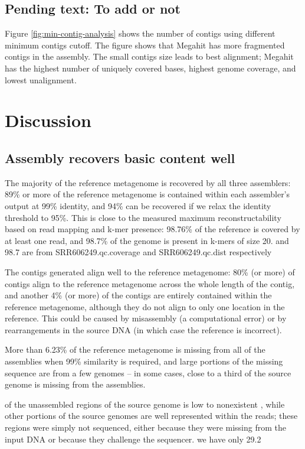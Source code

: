 \documentclass[10pt,a4paper,twocolumn]{article}
\begin{document}
\subsection*{Pending text: To add or not}
Figure \ref{fig:min-contig-analysis} shows the number of contigs using
different minimum contigs cutoff.  The figure shows that Megahit
\cite{megahit} has more fragmented contigs in the assembly. The small
contigs size leads to best alignment; Megahit has the highest number
of uniquely covered bases, highest genome coverage, and lowest
unalignment.

\section*{Discussion}
\subsection*{Assembly recovers basic content well}
The majority of the reference metagenome is recovered by all three
assemblers: 89\% or more of the reference metagenome is contained
within each assembler’s output at 99\% identity, and 94\% can be
recovered if we relax the identity threshold to 95\%.  This is close
to the measured maximum reconstructability based on read mapping and
k-mer presence: 98.76\% of the reference is covered by at least one
read, and 98.7\% of the genome is present in k-mers of size 20. %
and 98.7 are from SRR606249.qc.coverage and SRR606249.qc.dist
respectively

The contigs generated align well to the reference metagenome: 80\% (or
more) of contigs align to the reference metagenome across the whole
length of the contig, and another 4\% (or more) of the contigs are
entirely contained within the reference metagenome, although they do
not align to only one location in the reference. This could be caused
by misassembly (a computational error) or by rearrangements in the
source DNA (in which case the reference is incorrect).
 
More than 6.23\% of the reference metagenome is missing from all of
the assemblies when 99\% similarity is required, and large portions of
the missing sequence are from a few genomes -- in some cases, close to
a third of the source genome is missing from the assemblies.

of the unassembled regions of the source genome is low to nonexistent
, while other portions of the source genomes are well represented
within the reads; these regions were simply not sequenced, either
because they were missing from the input DNA or because they challenge
the sequencer. %
we have only 29.2%
\end{document}

